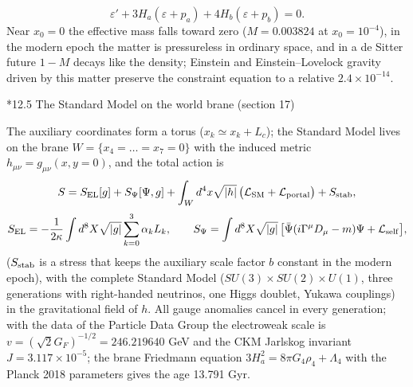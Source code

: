 \documentclass[10pt,a4paper]{article}
\makeatletter
\renewcommand\subsection{\@startsection{subsection}{2}{\z@}{-3.25ex\@plus -1ex \@minus -.2ex}{1.5ex \@plus .2ex}{\normalfont\large\bfseries\raggedright}}
\makeatother
\begin{document}
\begin{equation*}
\varepsilon'+3H_a(\varepsilon+p_a)+4H_b(\varepsilon+p_b)=0 .
\end{equation*}
Near $x_0=0$ the effective mass falls toward zero ($M=0.003824$ at $x_0=10^{-4}$), in the modern epoch the matter is pressureless in ordinary space, and in a de Sitter future $1-M$ decays like the density; Einstein and Einstein–Lovelock gravity driven by this matter preserve the constraint equation to a relative $2.4\times10^{-14}$.

\subsection*{12.5 The Standard Model on the world brane (section 17)}
The auxiliary coordinates form a torus ($x_k\simeq x_k+L_c$); the Standard Model lives on the brane $W=\lbrace x_4=\dots=x_7=0\rbrace$ with the induced metric $h_{\mu\nu}=g_{\mu\nu}(x,y=0)$, and the total action is
\begin{equation*}
S=S_{\rm EL}[g]+S_\Psi[\Psi,g]+\int_Wd^4x\sqrt{|h|}\,\big(\mathcal L_{\rm SM}+\mathcal L_{\rm portal}\big)+S_{\rm stab},
\end{equation*}
\begin{equation*}
S_{\rm EL}=-\frac1{2\kappa}\int d^8X\sqrt{|g|}\sum_{k=0}^{3}\alpha_kL_k,\qquad S_\Psi=\int d^8X\sqrt{|g|}\,\big[\bar\Psi(i\Gamma^\mu D_\mu-m)\Psi+\mathcal L_{\rm self}\big],
\end{equation*}
($S_{\rm stab}$ is a stress that keeps the auxiliary scale factor $b$ constant in the modern epoch), with the complete Standard Model ($SU(3)\times SU(2)\times U(1)$, three generations with right-handed neutrinos, one Higgs doublet, Yukawa couplings) in the gravitational field of $h$. All gauge anomalies cancel in every generation; with the data of the Particle Data Group the electroweak scale is $v=(\sqrt2G_F)^{-1/2}=246.219640$ GeV and the CKM Jarlskog invariant $J=3.117\times10^{-5}$; the brane Friedmann equation $3H_a^2=8\pi G_4\rho_4+\Lambda_4$ with the Planck 2018 parameters gives the age 13.791 Gyr.
\end{document}
